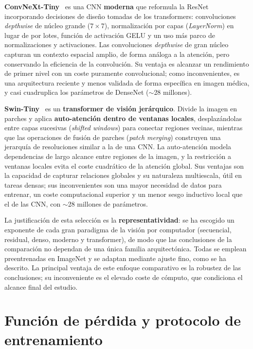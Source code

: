 \textbf{ConvNeXt-Tiny}~\cite{liuConvNet2020s2022} es una CNN \textbf{moderna} que
reformula la ResNet incorporando decisiones de diseño tomadas de los transformers:
convoluciones \textit{depthwise} de núcleo grande ($7\times7$), normalización por capas
(\textit{LayerNorm}) en lugar de por lotes, función de activación GELU y un uso más parco
de normalizaciones y activaciones. Las convoluciones \textit{depthwise} de gran núcleo
capturan un contexto espacial amplio, de forma análoga a la atención, pero conservando la
eficiencia de la convolución. Su ventaja es alcanzar un rendimiento de primer nivel con
un coste puramente convolucional; como inconvenientes, es una arquitectura reciente y
menos validada de forma específica en imagen médica, y casi cuadruplica los parámetros de
DenseNet ($\sim$28 millones).

\textbf{Swin-Tiny}~\cite{liuSwinTransformer2021} es un \textbf{transformer de visión
jerárquico}. Divide la imagen en parches y aplica \textbf{auto-atención dentro de ventanas
locales}, desplazándolas entre capas sucesivas (\textit{shifted windows}) para conectar
regiones vecinas, mientras que las operaciones de fusión de parches (\textit{patch
merging}) construyen una jerarquía de resoluciones similar a la de una CNN. La
auto-atención modela dependencias de largo alcance entre regiones de la imagen, y la
restricción a ventanas locales evita el coste cuadrático de la atención global. Sus
ventajas son la capacidad de capturar relaciones globales y su naturaleza multiescala,
útil en tareas densas; sus inconvenientes son una mayor necesidad de datos para entrenar,
un coste computacional superior y un menor sesgo inductivo local que el de las CNN, con
$\sim$28 millones de parámetros.

La justificación de esta selección es la \textbf{representatividad}: se ha escogido un
exponente de cada gran paradigma de la visión por computador (secuencial, residual,
denso, moderno y transformer), de modo que las conclusiones de la comparación no
dependan de una única familia arquitectónica. Todas se emplean preentrenadas en ImageNet
y se adaptan mediante ajuste fino, como se ha descrito. La principal ventaja de este
enfoque comparativo es la robustez de las conclusiones; su inconveniente es el elevado
coste de cómputo, que condiciona el alcance final del estudio.


\section{Función de pérdida y protocolo de entrenamiento}
\label{sec::mm_entrenamiento}

